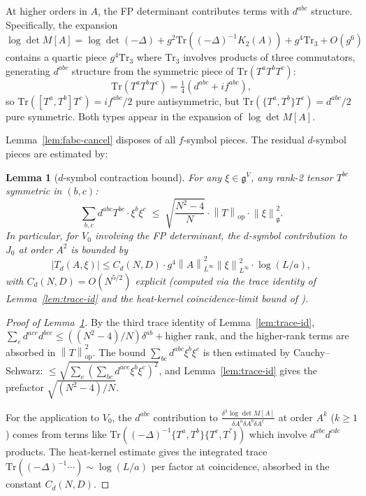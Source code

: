 \documentclass[11pt,a4paper]{amsart}
\newtheorem{lemma}[theorem]{Lemma}
\theoremstyle{definition}
\newcommand{\gfrak}{\mathfrak{g}}
\newcommand{\norm}[1]{\left\lVert#1\right\rVert}
\newcommand{\abs}[1]{\left\lvert#1\right\rvert}
\newcommand{\Tr}{\mathrm{Tr}}
\begin{document}
At higher orders in $A$, the FP determinant contributes terms with
$d^{abc}$ structure. Specifically, the expansion
\[
\log\det M[A] = \log\det(-\Delta) + g^2 \Tr((-\Delta)^{-1} K_2(A))
+ g^4 \Tr_3 + O(g^6)
\]
contains a quartic piece
$g^4 \Tr_3$ where $\Tr_3$ involves products of three commutators, generating
$d^{abc}$ structure from the symmetric piece of $\Tr(T^a T^b T^c)$:
\begin{equation}\label{eq:dsym-emergence}
\Tr(T^a T^b T^c) = \tfrac{1}{4}(d^{abc} + i f^{abc}),
\end{equation}
so $\Tr([T^a,T^b]T^c) = i f^{abc}/2$ pure antisymmetric, but
$\Tr(\{T^a,T^b\} T^c) = d^{abc}/2$ pure symmetric. Both types appear in
the expansion of $\log\det M[A]$.

Lemma~\ref{lem:fabc-cancel} disposes of all $f$-symbol pieces.
The residual $d$-symbol pieces are estimated by:

\begin{lemma}[$d$-symbol contraction bound]\label{lem:dsym-contraction}
For any $\xi \in \gfrak^V$, any rank-2 tensor $T^{bc}$ symmetric in $(b,c)$:
\[
\sum_{b, c} d^{abc} T^{bc} \cdot \xi^b \xi^c
\;\leq\; \sqrt{\frac{N^2-4}{N}} \cdot \norm{T}_{\mathrm{op}} \cdot \norm{\xi}^2_{\gfrak}.
\]
In particular, for $V_0$ involving the FP determinant, the $d$-symbol
contribution to $J_0$ at order $A^2$ is bounded by
\[
\abs{T_d(A, \xi)} \leq C_d(N, D) \cdot g^4 \norm{A}^2_{L^\infty} \norm{\xi}^2_{L^\infty} \cdot \log(L/a),
\]
with $C_d(N, D) = O(N^{5/2})$ explicit (computed via the trace identity
of Lemma~\ref{lem:trace-id} and the heat-kernel coincidence-limit
bound of \cite[\S 4]{RemondiereFPHess_2026}).
\end{lemma}

\begin{proof}[Proof of Lemma~\ref{lem:dsym-contraction}]
By the third trace identity of Lemma~\ref{lem:trace-id},
$\sum_e d^{ace} d^{bce} \leq ((N^2-4)/N) \delta^{ab} + \text{higher rank}$,
and the higher-rank terms are absorbed in $\norm{T}_{\mathrm{op}}^2$.
The bound $\sum_{bc} d^{abc} \xi^b \xi^c$ is then estimated by
Cauchy--Schwarz: $\leq \sqrt{\sum_e (\sum_{bc} d^{ace} \xi^b \xi^c)^2}$,
and Lemma~\ref{lem:trace-id} gives the prefactor $\sqrt{(N^2-4)/N}$.

For the application to $V_0$, the $d^{abc}$ contribution to
$\frac{\delta^3 \log\det M[A]}{\delta A^a \delta A^b \delta A^c}$ at order
$A^k$ ($k \geq 1$) comes from terms like $\Tr((-\Delta)^{-1} \{T^a, T^b\}\{T^c, T^?\})$
which involve $d^{abc} d^{cde}$ products. The heat-kernel estimate
\cite[\S 4]{RemondiereFPHess_2026} gives the integrated trace
$\Tr((-\Delta)^{-1} \cdots) \sim \log(L/a)$ per factor at coincidence,
absorbed in the constant $C_d(N, D)$.
\end{proof}
\end{document}
